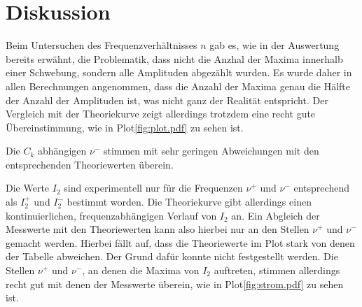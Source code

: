 \section{Diskussion}
\label{sec:Diskussion}

Beim Untersuchen des Frequenzverhältnisses $n$ gab es, wie in der Auswertung bereits erwähnt, die Problematik, dass nicht die Anzhal der 
Maxima innerhalb einer Schwebung, sondern alle Amplituden abgezählt wurden. Es wurde daher in allen Berechnungen angenommen, dass die 
Anzahl der Maxima genau die Hälfte der Anzahl der Amplituden ist, was nicht ganz der Realität entspricht. Der Vergleich mit der 
Theoriekurve zeigt allerdings trotzdem eine recht gute Übereinstimmung, wie in Plot\ref{fig:plot.pdf} zu sehen ist.

Die $C_k$ abhängigen $\nu^-$ stimmen mit sehr geringen Abweichungen mit den entsprechenden Theoriewerten überein.

Die Werte $I_2$ sind experimentell nur für die Frequenzen $\nu^+$ und $\nu^-$ entsprechend als $I_2^+$ und $I_2^-$ bestimmt worden.
Die Theoriekurve gibt allerdings einen kontinuierlichen, frequenzabhängigen Verlauf von $I_2$ an. Ein Abgleich der Messwerte mit den 
Theoriewerten kann also hierbei nur an den Stellen $\nu^+$ und $\nu^-$ gemacht werden. Hierbei fällt auf, dass die Theoriewerte im 
Plot stark von denen der Tabelle abweichen. Der Grund dafür konnte nicht festgestellt werden. Die Stellen $\nu^+$ und $\nu^-$, an denen die Maxima von 
$I_2$ auftreten, stimmen allerdings recht gut mit denen der Messwerte überein, wie in Plot\ref{fig:strom.pdf} zu sehen ist.

